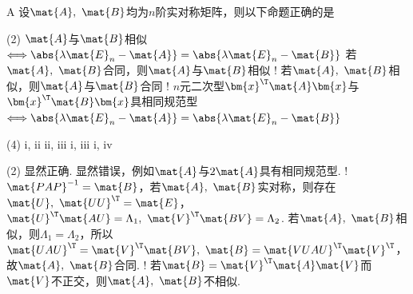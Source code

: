 \begin{choice}{A}
    设$\mat{A},\ \mat{B}$均为$n$阶实对称矩阵，则以下命题正确的是
\begin{tasks}[label=\roman*.](2)
    \task $\mat{A}$与$\mat{B}$相似$\Longleftrightarrow\abs{\lambda\mat{E}_n-\mat{A}}=\abs{\lambda\mat{E}_n-\mat{B}}$
    \task 若$\mat{A},\ \mat{B}$合同，则$\mat{A}$与$\mat{B}$相似
    \task! 若$\mat{A},\ \mat{B}$相似，则$\mat{A}$与$\mat{B}$合同
    \task! $n$元二次型$\bm{x}^\T\mat{A}\bm{x}$与$\bm{x}^\T\mat{B}\bm{x}$具相同规范型$\Longleftrightarrow\abs{\lambda\mat{E}_n-\mat{A}}=\abs{\lambda\mat{E}_n-\mat{B}}$
\end{tasks}
\begin{tasks}(4)
    \task i, ii
    \task ii, iii
    \task i, iii
    \task i, iv
\end{tasks}
\end{choice}
\begin{solution}
\begin{tasks}[label=\roman*.](2)
    \task 显然正确.
    \task 显然错误，例如$\mat{A}$与$2\mat{A}$具有相同规范型.
    \task! $\mat{PAP}^{-1}=\mat{B}$，若$\mat{A},\ \mat{B}$实对称，则存在$\mat{U},\ \mat{UU}^\T=\mat{E}$，$\mat{U}^\T\mat{AU}=\Lambda_1,\ \mat{V}^\T\mat{BV}=\Lambda_2$. 若$\mat{A},\ \mat{B}$相似，则$\Lambda_1=\Lambda_2$，所以$\mat{UAU}^\T=\mat{V}^\T\mat{BV},\ \mat{B}=\mat{VUAU}^\T\mat{V}^\T$，故$\mat{A},\ \mat{B}$合同.
    \task! 若$\mat{B}=\mat{V}^\T\mat{A}\mat{V}$而$\mat{V}$不正交，则$\mat{A},\ \mat{B}$不相似. 
\end{tasks}
\end{solution}

